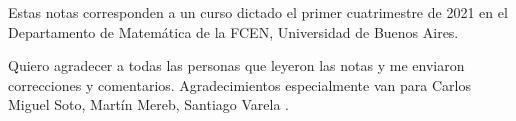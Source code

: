 \preface

Estas notas corresponden a un curso dictado el primer cuatrimestre de 2021 en 
el Departamento de Matemática de la FCEN, Universidad de Buenos Aires. 

Quiero agradecer a todas las personas que leyeron las notas y me enviaron 
correcciones y comentarios. Agradecimientos especialmente van para
Carlos Miguel Soto, 
Martín Mereb, 
Santiago Varela
.